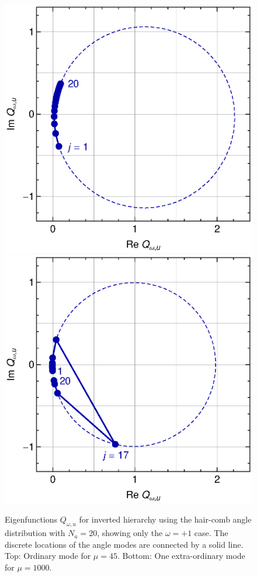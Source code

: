 \documentclass[twocolumn,prd,showpacs,
floatfix,preprintnumbers,nofootinbib]{revtex4}
\begin{document}
\begin{figure}
\includegraphics[width=0.8\columnwidth]{disvec1.eps}
\vskip12pt
\includegraphics[width=0.8\columnwidth]{disvec2.eps}
\caption{Eigenfunctions $Q_{\omega,u}$ for inverted hierarchy
using the hair-comb angle distribution with $N_a=20$, showing
only the $\omega=+1$ case. The discrete locations of the angle modes
are connected by a solid line.
Top: Ordinary mode for $\mu=45$. Bottom: One extra-ordinary mode for
$\mu=1000$.
\label{fig:disvec}}
\end{figure}
\end{document}
